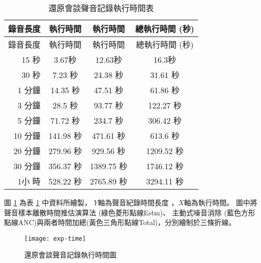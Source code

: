 \begin{longtable}{| r | c | c | c |}
    \caption{還原會談聲音記錄執行時間表}\label{table:exp-time} \\
    \hline
    \multicolumn{1}{|r|}{錄音長度} &
    \multicolumn{1}{|c|}{\DEFfuncEstm{} 執行時間} &
    \multicolumn{1}{|c|}{\DEFfuncAnc{} 執行時間} &
    \multicolumn{1}{|c|}{總執行時間 (秒)} \\
    \hline
    \endfirsthead

    \multicolumn{1}{|r|}{錄音長度} &
    \multicolumn{1}{|c|}{\DEFfuncEstm{} 執行時間} &
    \multicolumn{1}{|c|}{\DEFfuncAnc{} 執行時間} &
    \multicolumn{1}{|c|}{總執行時間 (秒)} \\
    \hline
    \endhead

    \hline
    \endlastfoot

    15 秒 & 3.67秒 & 12.63秒 & 16.3秒 \\

    30 秒 & 7.23 秒 & 24.38 秒 & 31.61 秒 \\

    1 分鐘 & 14.35 秒 & 47.51 秒 & 61.86 秒 \\

    3 分鐘 & 28.5 秒 & 93.77 秒 & 122.27 秒 \\

    5 分鐘 & 71.72 秒 & 234.7 秒 & 306.42 秒 \\

    10 分鐘 & 141.98 秒 & 471.61 秒 & 613.6 秒 \\

    20 分鐘 & 279.96 秒 & 929.56 秒 & 1209.52 秒 \\

    30 分鐘 & 356.37 秒 & 1389.75 秒 & 1746.12 秒 \\

    1小 時 & 528.22 秒 & 2765.89 秒 & 3294.11 秒 \\
\end{longtable}

    圖 \ref{fig:exp-time} 為表 \ref{table:exp-time} 中資料所繪製，
$Y$軸為聲音紀錄時間長度 \DEFtimeREC，$X$軸為執行時間。
圖中將聲音樣本離散時間推估演算法 \DEFfuncEstm{} (綠色菱形點線Estm)、
主動式噪音消除 \DEFfuncAnc{}(藍色方形點線ANC)與兩者時間加總(黃色三角形點線Total)，分別繪制於三條折線。

\begin{figure}[H]
    \centering
    \texttt{[image: exp-time]}
    \caption{還原會談聲音記錄執行時間圖}\label{fig:exp-time}
\end{figure}


